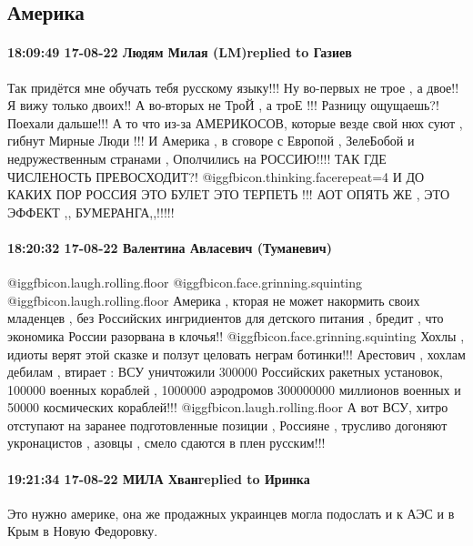  
 
 
 
 

\subsection{Америка}

\paragraph{18:09:49 17-08-22 Людям Милая (LM)replied to Газиев}

Так придётся мне обучать тебя русскому языку!!!
Ну во-первых не трое , а двое!! Я вижу только двоих!!
А во-вторых не
ТроЙ , а троЕ !!! Разницу ощущаешь?!
Поехали дальше!!!
А то что из-за АМЕРИКОСОВ, которые везде свой нюх суют , гибнут Мирные Люди !!!
И Америка , в сговоре с Европой , ЗелеБобой и недружественным странами , Ополчились на РОССИЮ!!!! ТАК ГДЕ ЧИСЛЕНОСТЬ ПРЕВОСХОДИТ?! @igg{fbicon.thinking.face}{repeat=4}  И ДО КАКИХ ПОР РОССИЯ ЭТО БУЛЕТ ЭТО ТЕРПЕТЬ !!!
АОТ ОПЯТЬ ЖЕ , ЭТО ЭФФЕКТ ,, БУМЕРАНГА,,!!!!!


\paragraph{18:20:32 17-08-22 Валентина Авласевич (Туманевич)}

@igg{fbicon.laugh.rolling.floor}  @igg{fbicon.face.grinning.squinting}
@igg{fbicon.laugh.rolling.floor}  Америка , кторая не может накормить своих
младенцев , без Российских ингридиентов для детского питания , бредит , что
экономика России разорвана в клочья!! @igg{fbicon.face.grinning.squinting}
Хохлы , идиоты верят этой сказке и ползут целовать неграм ботинки!!!
Арестович , хохлам дебилам , втирает : ВСУ уничтожили 300000 Российских
ракетных установок, 100000 военных кораблей , 1000000 аэродромов 300000000
миллионов военных и 50000 космических кораблей!!!
@igg{fbicon.laugh.rolling.floor}  А вот ВСУ, хитро отступают на заранее
подготовленные позиции , Россияне , трусливо догоняют укронацистов , азовцы ,
смело сдаются в плен русским!!!

\paragraph{19:21:34 17-08-22 МИЛА Хванreplied to Иринка}

Это нужно америке, она же продажных украинцев могла подослать и к АЭС и в Крым
в Новую Федоровку.
